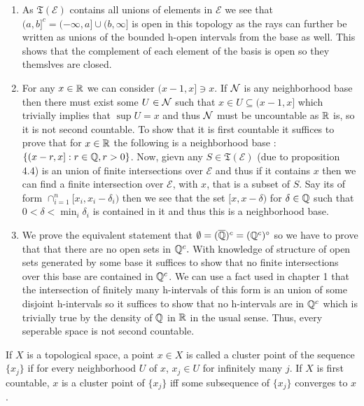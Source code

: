 \documentclass[12pt,a4paper]{article}
\begin{document}
\begin{solution}
\begin{enumerate}[label=\alph*.]
    \item As $\mathfrak T(\mathcal E)$ contains all unions of elements in $\mathcal E$ we see that $(a,b]^c=(-\infty,a]\cup(b,\infty]$ is open in this topology as the rays can further be written as unions of the bounded h-open intervals from the base as well. 
        This shows that the complement of each element of the basis is open so they themslves are closed. 
    \item For any $x\in\mathbb{R}$ we can consider $(x-1,x]\ni x$. 
        If $\mathcal{N}$ is any neighborhood base then there must exist some $U\in\mathcal{N}$ such that $x\in U\subseteq(x-1,x]$ which trivially implies that $\sup U=x$ and thus $\mathcal{N}$ must be uncountable as $\mathbb{R}$ is, so it is not second countable. 
        To show that it is first countable it suffices to prove that for $x\in\mathbb{R} $ the following is a neighborhood base :
        $ \qty{(x-r,x]:r\in\mathbb{Q},r>0}$. 
        Now, gievn any $S\in\mathfrak T(\mathcal E)$ (due to proposition 4.4) is an union of finite intersections over $\mathcal E$ and thus if it contains $x$ then we can find a finite intersection over $\mathcal E$, with $x$, that is a subset of $S$. 
        Say its of form $\cap_{i=1}^n[x_i,x_i-\delta_i)$ then we see that the set $[x,x-\delta)$ for $\delta\in\mathbb{Q}$ such that $0<\delta<\min_i\delta_i$ is contained in it and thus this is a neighborhood base. 
    \item We prove the equivalent statement that $\emptyset=(\overline{\mathbb{Q}})^c=(\mathbb{Q}^c)^\circ$ so we have to prove that that there are no open sets in $\mathbb{Q}^c.$ 
        With knowledge of structure of open sets generated by some base it suffices to show that no finite intersections over this base are contained in $\mathbb{Q}^c$. 
        We can use a fact used in chapter 1 that the intersection of finitely many h-intervals of this form is an union of some disjoint h-intervals so it suffices to show that no  h-intervals are in $\mathbb{Q}^c$ which is trivially true by the density of $\mathbb{Q}$ in $\mathbb{R}$ in the usual sense. 
        Thus, every seperable space is not second countable.
\end{enumerate}
\end{solution}
\begin{problem}\label{prob:4-7}
If $X$ is a topological space, a point $x \in X$ is called a cluster point of the sequence $\{x_j\}$ if for every neighborhood $U$ of $x$, $x_j \in U$ for infinitely many $j$. If $X$ is first countable, $x$ is a cluster point of $\{x_j\}$ iff some subsequence of $\{x_j\}$ converges to $x$.
\end{problem}
\end{document}

